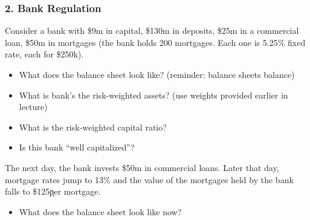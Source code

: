 \documentclass{beamer}
\begin{document}
\begin{practiceframe}[t]
\frametitle{2. Bank Regulation}

Consider a bank with \$9m in capital, \$130m in deposits, \$25m in a commercial loan, \$50m in mortgages (the bank holds 200 mortgages.  Each one is 5.25\% fixed rate, each for \$250k).  

    \begin{itemize}
        \item What does the balance sheet look like?  (reminder: balance sheets balance)
        \item What is bank’s the risk-weighted assets? (use weights provided earlier in lecture)
        \item What is the risk-weighted capital ratio?
        \item Is this bank “well capitalized”?
    \end{itemize}
    \vspace{1em}
    The next day, the bank invests \$50m in commercial loans.  Later that day, mortgage rates jump to 13\% and the value of the mortgages held by the bank falls to \$125\k per mortgage.
    
    \begin{itemize}
        \item What does the balance sheet look like now?
    \end{itemize}
    
\end{practiceframe}

\end{document}
